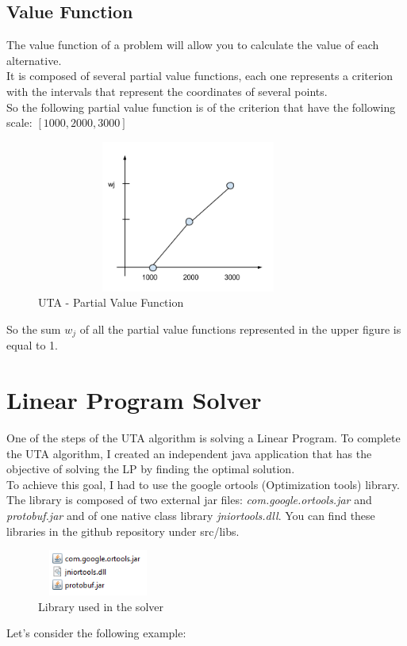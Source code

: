 \documentclass{report}
\begin{document}
\subsection{Value Function}
The value function of a problem will allow you to calculate the value of each alternative.\\
It is composed of several partial value functions, each one represents a criterion with the intervals that represent the coordinates of several points.\\
So the following partial value function is of the criterion that have the following scale: $[1000,2000,3000]$
\begin{figure}[H]
\centering
\includegraphics[width=10cm,height=5cm,keepaspectratio]{pvf.png}
\caption{UTA - Partial Value Function}
\end{figure}
So the sum $w_j$ of all the partial value functions represented in the upper figure is equal to 1.\\

\section{Linear Program Solver}
One of the steps of the UTA algorithm is solving a Linear Program. To complete the UTA algorithm, I created an independent java application that has the objective of solving the LP by finding the optimal solution.\\
To achieve this goal, I had to use the google ortools (Optimization tools) library. The library is composed of two external jar files: \textit{com.google.ortools.jar} and \textit{protobuf.jar} and of one native class library \textit{jniortools.dll}. You can find these libraries in the github repository under src/libs.
\begin{figure}[H]
\centering
\includegraphics[width=4cm,height=1.5cm,keepaspectratio]{lp-libs.png}
\caption{Library used in the solver}
\end{figure}
Let's consider the following example:\\
\end{document}
